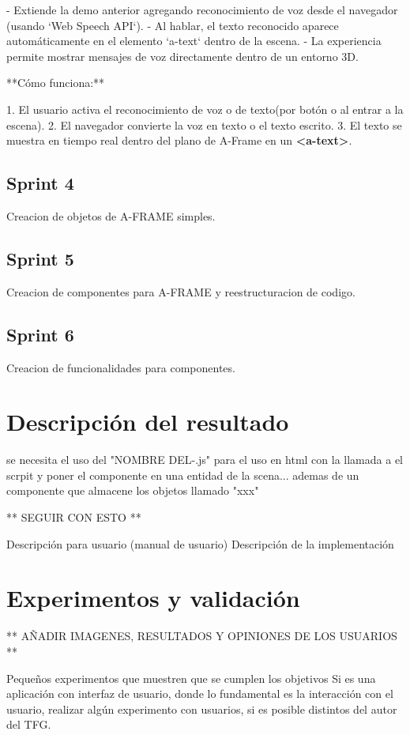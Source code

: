 \documentclass[a4paper, 12pt]{book}
\begin{document}
- Extiende la demo anterior agregando reconocimiento de voz desde el navegador (usando `Web Speech API`).
- Al hablar, el texto reconocido aparece automáticamente en el elemento `a-text` dentro de la escena.
- La experiencia permite mostrar mensajes de voz directamente dentro de un entorno 3D.  

**Cómo funciona:**

1. El usuario activa el reconocimiento de voz o de texto(por botón o al entrar a la escena).
2. El navegador convierte la voz en texto o el texto escrito.
3. El texto se muestra en tiempo real dentro del plano de A-Frame en un \textbf{<a-text>}.


\section{Sprint 4} 
\label{sec:sprint4}
Creacion de objetos de A-FRAME simples.
\section{Sprint 5} 
\label{sec:sprint5}
Creacion de componentes para A-FRAME y reestructuracion de codigo.
\section{Sprint 6} 
\label{sec:sprint6}
Creacion de funcionalidades para componentes.

\chapter{Descripción del resultado}
\label{chap:descripcion}

se necesita el uso del "NOMBRE DEL-.js" para el uso en html con la llamada a el scrpit y poner el componente en una entidad de la scena...
ademas de un componente que almacene los objetos llamado "xxx"

** SEGUIR CON ESTO **

Descripción para usuario (manual de usuario)
Descripción de la implementación


\chapter{Experimentos y validación}
\label{chap:experimentos}

** AÑADIR IMAGENES, RESULTADOS Y OPINIONES DE LOS USUARIOS **

Pequeños experimentos que muestren que se cumplen los objetivos
Si es una aplicación con interfaz de usuario, donde lo fundamental es la interacción con el usuario, realizar algún experimento con usuarios, si es posible distintos del autor del TFG.
\end{document}
